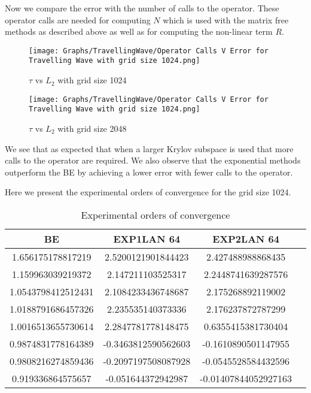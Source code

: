 Now we compare the error with the number of calls to the operator.
These operator calls are needed for computing $N$ which is used with the matrix free methods as described above as well as for computing the non-linear term $R$.

\begin{figure}[H]
    \centering
    \begin{minipage}{0.49\textwidth}
        \texttt{[image: Graphs/TravellingWave/Operator Calls V Error for Travelling Wave with grid size 1024.png]} %
        \caption{$\tau$ vs $L_2$ with grid size 1024}
        \label{fig:plot1}
    \end{minipage}\hfill
    \centering
    \begin{minipage}{0.49\textwidth}
        \texttt{[image: Graphs/TravellingWave/Operator Calls V Error for Travelling Wave with grid size 1024.png]} %
        \caption{$\tau$ vs $L_2$ with grid size 2048}
        \label{fig:plot2}
    \end{minipage}\hfill
\end{figure}

We see that as expected that when a larger Krylov subspace is used that more calls to the operator are required.
We also observe that the exponential methods outperform the BE by achieving a lower error with fewer calls to the operator.

Here we present the experimental orders of convergence for the grid size 1024.

\begin{table}[H]
    \centering
    \begin{tabular}{| c | c | c | c}
    \hline
    BE & EXP1LAN 64 & EXP2LAN 64 \\
    \hline
    1.656175178817219 & 2.5200121901844423 & 2.427488988868435 \\
    1.159963039219372 & 2.147211103525317 & 2.2448741639287576 \\
    1.0543798412512431 & 2.1084233436748687 & 2.175268892119002 \\
    1.0188791686457326 & 2.235535140373336 & 2.176237872787299 \\
    1.0016513655730614 & 2.2847781778148475 & 0.6355415381730404 \\
    0.9874831778164389 & -0.3463812590562603 & -0.1610890501147955 \\
    0.9808216274859436 & -0.2097197508087928 & -0.0545528584432596 \\
    0.919336864575657 & -0.051644372942987 & -0.01407844052927163 \\
    \hline
    \end{tabular}
    \caption{Experimental orders of convergence}
    \label{tab:EOCs}
\end{table}


